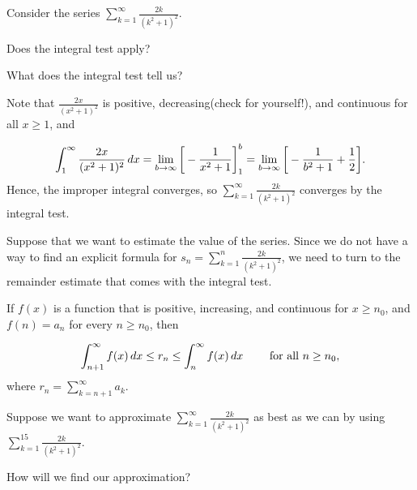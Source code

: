\documentclass{ximera}
\author{Jim Talamo}
\begin{document}
\begin{exercise}

Consider the series $\sum_{k=1}^{\infty} \frac{2k}{(k^2+1)^2}$.  

Does the integral test apply?

\begin{multipleChoice}
\end{multipleChoice}

What does the integral test tell us?
\begin{multipleChoice}
\end{multipleChoice}

\begin{feedback}
Note that $\frac{2x}{(x^2+1)^2}$ is positive, decreasing(check for yourself!), and continuous for all $x \geq 1$, and

\[
\int_1^\infty \frac{2x}{(x^2+1)^2} \d x = \lim_{b \to \infty} \eval{-\frac{1}{x^2+1}}_1^b = \lim_{b \to \infty} \eval{-\frac{1}{b^2+1}+\frac{1}{2}}.
\]
Hence, the improper integral converges, so $\sum_{k=1}^{\infty}  \frac{2k}{(k^2+1)^2}$ converges by the integral test.  

Suppose that we want to estimate the value of the series.  Since we do not have a way to find an explicit formula for $s_n=\sum_{k=1}^n \frac{2k}{(k^2+1)^2}$, we need to turn to the remainder estimate that comes with the integral test.

\begin{theorem}
If $f(x)$ is a function that is positive, increasing, and continuous for $x \geq n_0$,  and $f(n) = a_n$ for every $n \geq n_0$, then 

\[
\int_{n+1}^{\infty} f(x) \,d x \leq  r_n \leq \int_{n}^{\infty} f(x) \,d x \qquad \textrm{ for all } n \geq n_0,
\]
where $r_n = \sum_{k=n+1}^{\infty} a_k$.
\end{theorem}

\end{feedback}


\begin{exercise}
Suppose we want to approximate $\sum_{k=1}^{\infty} \frac{2k}{(k^2+1)^2}$ as best as we can by using $\sum_{k=1}^{15} \frac{2k}{(k^2+1)^2}$.  

How will we find our approximation?

\begin{multipleChoice}
\end{multipleChoice}


\end{exercise}
\end{exercise}
\end{document}
